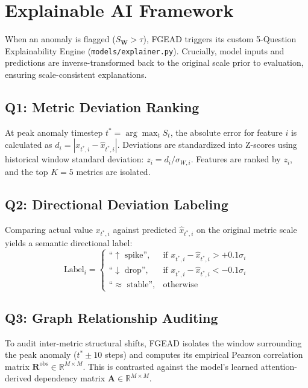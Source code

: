 \documentclass[conference]{IEEEtran}
\begin{document}
\section{Explainable AI Framework}

When an anomaly is flagged ($S_{\mathbf{W}} > \tau$), FGEAD triggers its custom 5-Question Explainability Engine (\texttt{models/explainer.py}). Crucially, model inputs and predictions are inverse-transformed back to the original scale prior to evaluation, ensuring scale-consistent explanations.

\subsection{Q1: Metric Deviation Ranking}
At peak anomaly timestep $t^* = \arg\max_{t} S_t$, the absolute error for feature $i$ is calculated as $d_i = |x_{t^*, i} - \hat{x}_{t^*, i}|$. Deviations are standardized into Z-scores using historical window standard deviation: $z_i = d_i / \sigma_{W, i}$. Features are ranked by $z_i$, and the top $K=5$ metrics are isolated.

\subsection{Q2: Directional Deviation Labeling}
Comparing actual value $x_{t^*, i}$ against predicted $\hat{x}_{t^*, i}$ on the original metric scale yields a semantic directional label:
\begin{equation}
    \text{Label}_i = \begin{cases}
    \text{``}\uparrow \text{ spike''}, & \text{if } x_{t^*, i} - \hat{x}_{t^*, i} > +0.1 \sigma_i \\
    \text{``}\downarrow \text{ drop''}, & \text{if } x_{t^*, i} - \hat{x}_{t^*, i} < -0.1 \sigma_i \\
    \text{``}\approx \text{ stable''}, & \text{otherwise}
    \end{cases}
\end{equation}

\subsection{Q3: Graph Relationship Auditing}
To audit inter-metric structural shifts, FGEAD isolates the window surrounding the peak anomaly ($t^* \pm 10$ steps) and computes its empirical Pearson correlation matrix $\mathbf{R}^{\text{obs}} \in \mathbb{R}^{M \times M}$. This is contrasted against the model's learned attention-derived dependency matrix $\mathbf{A} \in \mathbb{R}^{M \times M}$.
\end{document}
